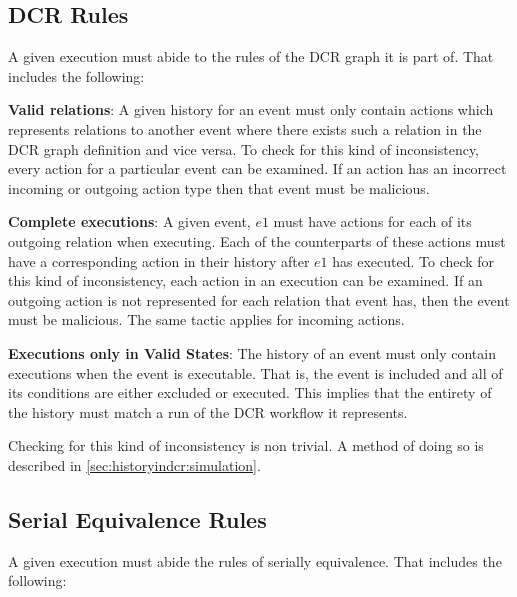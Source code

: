		
	\subsection{DCR Rules}
	A given execution must abide to the rules of the DCR graph it is part of. That includes the following:
	
	\newpar \textbf{Valid relations}: A given history for an event must only contain actions which represents relations to another event where there exists such a relation in the DCR graph definition and vice versa. 
	To check for this kind of inconsistency, every action for a particular event can be examined. If an action has an incorrect incoming or outgoing action type then that event must be malicious. 
	
	\newpar \textbf{Complete executions}: A given event, $e1$ must have actions for each of its outgoing relation when executing. Each of the counterparts of these actions must have a corresponding action in their history after $e1$ has executed.
	To check for this kind of inconsistency, each action in an execution can be examined. If an outgoing action is not represented for each relation that event has, then the event must be malicious. The same tactic applies for incoming actions.
	
	\newpar \textbf{Executions only in Valid States}: The history of an event must only contain executions when the event is executable. That is, the event is included and all of its conditions are either excluded or executed. This implies that the entirety of the history must match a run of the DCR workflow it represents.
	
	Checking for this kind of inconsistency is non trivial. A method of doing so is described in \autoref{sec:historyindcr:simulation}.
	
	\subsection{Serial Equivalence Rules}
	A given execution must abide the rules of serially equivalence. That includes the following:
	
